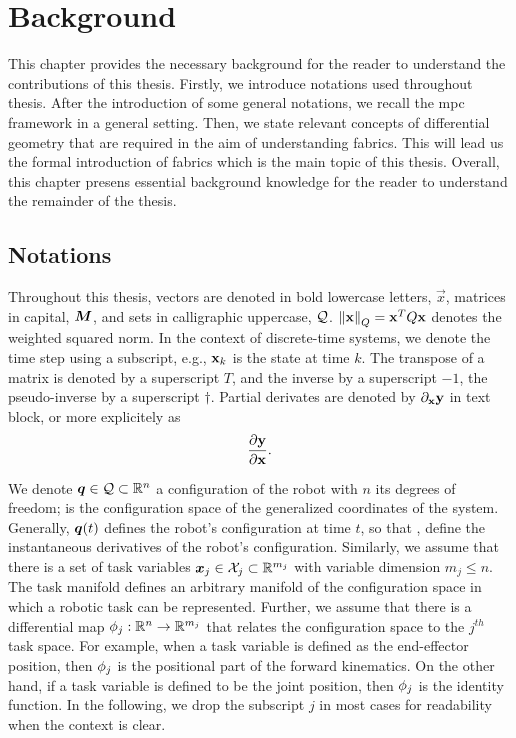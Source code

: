 \chapter{Background} %
\label{cha:background}

This chapter provides the necessary background for the reader to understand the
contributions of this thesis. Firstly, we introduce
notations used throughout thesis.
After the introduction of some general notations, we recall the
\ac{mpc} framework in a general setting. Then, we state
relevant concepts of differential geometry that are required
in the aim of understanding \ac{fabrics}. This will lead us
the formal introduction of \ac{fabrics} which is the main
topic of this thesis. Overall, this chapter presens essential
background knowledge for the reader to understand the
remainder of the thesis. 

\section{Notations} %
\label{sec:notations}

Throughout this thesis, vectors are denoted in bold lowercase
letters, $\vec{x}$, matrices in capital, $\bm{M}$, and sets
in calligraphic uppercase, $\mathcal{Q}$. $\left\lVert\mathbf{x}\right\rVert_Q = \mathbf{x}^TQ\mathbf{x}$
denotes the weighted squared norm. In the context of
discrete-time systems, we denote the time step using a
subscript, e.g., $\mathbf{x}_k$ is the state at time $k$. The
transpose of a matrix is denoted by a superscript $T$, and
the inverse by a superscript $-1$, the pseudo-inverse by a
superscript $\dagger$. Partial derivates are denoted by 
$\partial_{\mathbf{x}}\mathbf{y}$ in text block, or more explicitely as
\[\frac{\partial\mathbf{y}}{\partial\mathbf{x}}.\]


We denote $\bm{q}\in\mathcal{Q}\subset\mathbb{R}^n$ a configuration of the robot
with $n$ its degrees of freedom; \Q{} is the configuration
space of the generalized coordinates of the system.
Generally, $\bm{q}(t)$ defines the robot's configuration at time
$t$, so that \qdot, \qddot{} define the instantaneous
derivatives of the robot's configuration. Similarly, we
assume that there is a set of task variables
$\bm{x}_j\in\mathcal{X}_j\subset\mathbb{R}^{m_j}$ with variable dimension $m_j \leq n$.
The task manifold \Xj{} defines an arbitrary manifold of the
configuration space \Q{} in which a robotic task can be
represented. Further, we assume that there is a differential
map $\phi_j:\mathbb{R}^n\rightarrow\mathbb{R}^{m_j}$ that relates the
configuration space to the $j^{th}$ task space. For example,
when a task variable is defined as the end-effector
position, then $\phi_j$ is the positional part of the
forward kinematics. On the other hand, if a task variable is
defined to be the joint position, then $\phi_j$ is the
identity function. In the following, we drop the subscript
$j$ in most cases for readability when the context is clear.

